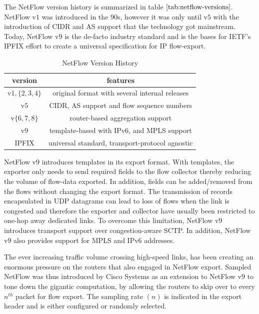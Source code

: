 The NetFlow version history is summarized in table $\ref{tab:netflow-versions}$. NetFlow v$1$ was introduced in the $90$s, however it was only until v$5$ with the introduction of \ac{CIDR} and \ac{AS} support that the  technology got mainstream. Today, NetFlow v$9$ is the de-facto industry standard and is the bases for \ac{IETF}'s \ac{IPFIX} effort to create a universal specification for \ac{IP} flow-export. 
\begin{table}[h!]
	\begin{center}
		\begin{tabular}{|c|c|}
			\hline	
			version & features \\
			\hline
			\hline 
			v$1, \{2,3,4\}$ & original format with several internal releases \\
			\hline 
			v$5$ & \ac{CIDR}, \ac{AS} support and flow sequence numbers \\
			\hline
			v$\{6,7,8\}$ & router-based aggregation support \\
			\hline
			v$9$ & template-based with \ac{IP}v$6$, and \ac{MPLS} support \\
			\hline
			\ac{IPFIX} & universal standard, transport-protocol agnostic\\
			\hline
		\end{tabular}
	\end{center}
	\caption{NetFlow Version History}
\label{tab:netflow-versions}
\end{table}

NetFlow v$9$ introduces templates in its export format. With templates, the exporter only needs to send required fields to the flow collector thereby reducing the volume of flow-data exported. In addition, fields can be added/removed from the flows without changing the export format. The transmission  of records encapsulated in \ac{UDP} datagrams can lead to loss of flows when the link is congested and therefore the exporter and collector have usually been restricted to one-hop away dedicated links. To overcome this limitation, NetFlow v$9$ introduces transport support over congestion-aware \ac{SCTP}. In addition, NetFlow v$9$ also provides support for \ac{MPLS} and \ac{IP}v$6$ addresses. 

The ever increasing traffic volume crossing high-speed links, has been creating an enormous pressure on the routers that also engaged in NetFlow export. Sampled NetFlow was thus introduced by Cisco Systems as an extension to NetFlow v$9$  to tone down the gigantic computation, by allowing the routers to skip over to every $n^{th}$ packet for flow export. The sampling rate $(n)$ is indicated in the export header and is either configured or randomly selected. 

